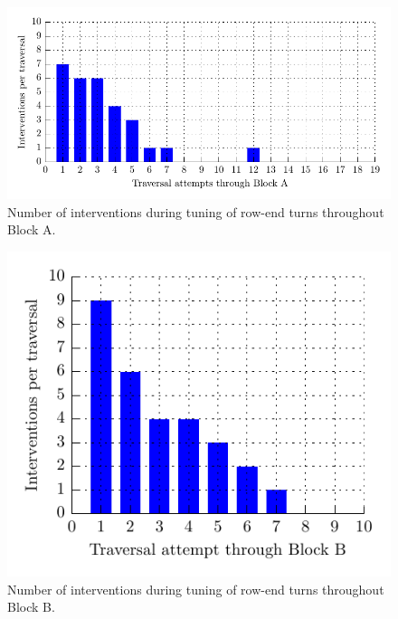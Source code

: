 \documentclass[preprint,authoryear,12pt]{elsarticle}
\begin{document}
    \begin{figure}[htb]
        \centering
        \includegraphics{imgs/tuning_graphs/bateman.pdf}
        \caption{
            Number of interventions during tuning of row-end turns throughout Block A.
        }
        \label{fig:block_traversal_bateman}
    \end{figure}

    \begin{figure}[htb]
        \centering
        \includegraphics{imgs/tuning_graphs/newnham.pdf}
        \caption{
            Number of interventions during tuning of row-end turns throughout Block B.
        }
        \label{fig:block_traversal_newnham}
    \end{figure}
\end{document}
